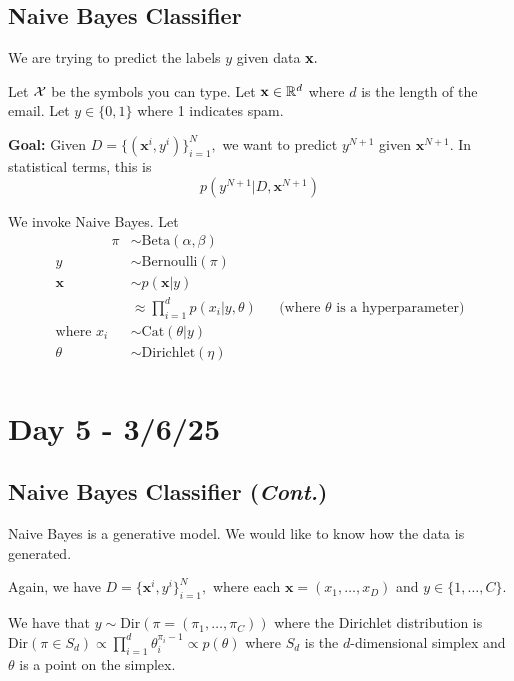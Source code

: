 \documentclass{chaistyle}
\begin{document}
\subsection*{Naive Bayes Classifier}
We are trying to predict the labels \(y\) given data \(\bf x.\)
\begin{example*}
    Let \(\cal X\) be the symbols you can type. Let \(\mathbf{x}\in\mathbb{R}^d\) where \(d\) is the length of the email. Let \(y\in\{0,1\}\) where 1 indicates spam.

    \textbf{Goal:} Given \(D=\{(\mathbf{x}^i,y^i)\}_{i=1}^N,\) we want to predict \(y^{N+1}\) given \(\mathbf{x}^{N+1}.\) In statistical terms, this is \[p(y^{N+1}|D,\textbf{x}^{N+1})\]
\end{example*}
We invoke Naive Bayes. Let \begin{align*}
    \qquad\qquad\pi&\sim\text{Beta}(\alpha,\beta) \\
    y&\sim\text{Bernoulli}(\pi) \\ 
    \mathbf{x}&\sim p(\textbf {x}|y) \\ 
    &\approx \prod_{i=1}^{d} p(x_i|y,\theta) &&\text{(where \(\theta\) is a hyperparameter)} \\
    \text{where }x_i&\sim\text{Cat}(\theta|y) \\
    \theta&\sim\text{Dirichlet}(\eta) \\
\end{align*}
\section*{Day 5 - 3/6/25}
\subsection*{Naive Bayes Classifier (\emph{Cont.})}
Naive Bayes is a generative model. We would like to know how the data is generated. 

Again, we have \(D=\{\mathbf{x}^i, y^i\}_{i=1}^N,\) where each \(\mathbf{x}=(x_1,\dots,x_D)\) and \(y\in\{1,\dots,C\}.\) 

We have that \(y\sim \text{Dir}(\pi=(\pi_1,\dots,\pi_C))\) where the Dirichlet distribution is \(\text{Dir}(\pi\in S_d)\propto \prod_{i=1}^{d}\theta_i^{\pi_i-1}\propto p(\theta)\) where \(S_d\) is the \(d\)-dimensional simplex and \(\theta\) is a point on the simplex.
\end{document}

